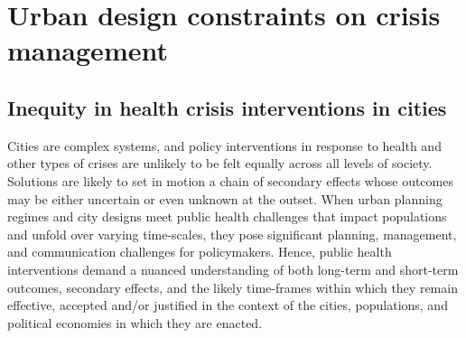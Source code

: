 \documentclass[preprint,10pt]{elsarticle} %
\begin{document}

%
%
%
%
%


\section*{\textcolor{OliveGreen}{Urban design constraints on crisis management}}
\subsection*{Inequity in health crisis interventions in cities}

Cities are complex systems\cite{DiezRoux2015}, and policy interventions in response to health and other types of crises are unlikely to be felt equally across all levels of society. Solutions are likely to set in motion a chain of secondary effects whose outcomes may be either uncertain or even unknown at the outset\cite{Sterman2006}. When urban planning regimes and city designs meet public health challenges that impact populations and unfold over varying time-scales\cite{casti2012x}, they pose significant planning, management, and communication challenges for policymakers\cite{thompson2022modelling,thompson2022framework}. Hence, public health interventions demand a nuanced understanding of both long-term and short-term  outcomes, secondary effects, and the likely time-frames within which they remain effective, accepted and/or justified in the context of the cities, populations, and political economies in which they are enacted\cite{dawson2016snakes, oliu2021sars}.
\end{document}
